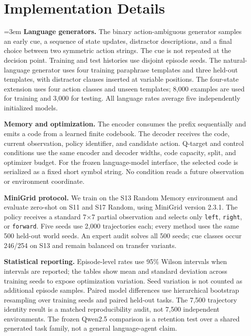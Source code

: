 \documentclass{article}
\def\qwen{Qwen2.5}
\begin{document}
\section{Implementation Details}
\emergencystretch=3em
\textbf{Language generators.} The binary action-ambiguous generator samples an early cue, a sequence of state updates, distractor descriptions, and a final choice between two symmetric action strings. The cue is not repeated at the decision point. Training and test histories use disjoint episode seeds. The natural-language generator uses four training paraphrase templates and three held-out templates, with distractor clauses inserted at variable positions. The four-state extension uses four action classes and unseen templates; 8,000 examples are used for training and 3,000 for testing. All language rates average five independently initialized models.

\textbf{Memory and optimization.} The encoder consumes the prefix sequentially and emits a code from a learned finite codebook. The decoder receives the code, current observation, policy identifier, and candidate action. Q-target and control conditions use the same encoder and decoder widths, code capacity, split, and optimizer budget. For the frozen language-model interface, the selected code is serialized as a fixed short symbol string. No condition reads a future observation or environment coordinate.

\textbf{MiniGrid protocol.} We train on the S13 Random Memory environment and evaluate zero-shot on S11 and S17 Random, using MiniGrid version 2.3.1. The policy receives a standard 7$\times$7 partial observation and selects only \texttt{left}, \texttt{right}, or \texttt{forward}. Five seeds use 2,000 trajectories each; every method uses the same 500 held-out world seeds. An expert audit solves all 500 seeds; cue classes occur 246/254 on S13 and remain balanced on transfer variants.

\textbf{Statistical reporting.} Episode-level rates use 95\% Wilson intervals when intervals are reported; the tables show mean and standard deviation across training seeds to expose optimization variation. Seed variation is not counted as additional episode samples. Paired model differences use hierarchical bootstrap resampling over training seeds and paired held-out tasks. The 7,500 trajectory identity result is a matched reproducibility audit, not 7,500 independent environments. The frozen \qwen{} comparison is a retention test over a shared generated task family, not a general language-agent claim.
\end{document}
